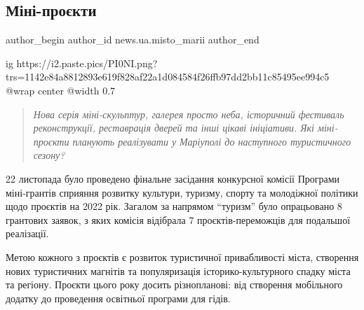  
 
 
 
 
 
\subsection{Міні-проєкти}
\label{sec:23_11_2021.stz.news.ua.misto_marii.1.mini_proekty_plany}
 
\ifcmt
 author_begin
   author_id news.ua.misto_marii
 author_end
\fi

\ifcmt
  ig https://i2.paste.pics/PI0NI.png?trs=1142e84a8812893e619f828af22a1d084584f26ffb97dd2bb11c85495ee994c5
  @wrap center
  @width 0.7
\fi

\begin{quote}
\em
Нова серія міні-скульптур, галерея просто неба, історичний фестиваль
реконструкції, реставрація дверей та інші цікаві ініціативи. Які міні-проєкти
планують реалізувати у Маріуполі до наступного туристичного сезону?	
\end{quote}

22 листопада було проведено фінальне засідання конкурсної комісії Програми
міні-грантів сприяння розвитку культури, туризму, спорту та молодіжної політики
щодо проєктів на 2022 рік. Загалом за напрямом \enquote{туризм} було опрацьовано 8
грантових заявок, з яких комісія відібрала 7 проєктів-переможців для подальшої
реалізації.

Метою кожного з проєктів є розвиток туристичної привабливості міста, створення
нових туристичних магнітів та популяризація історико-культурного спадку міста
та регіону. Проєкти цього року досить різнопланові: від створення мобільного
додатку до проведення освітньої програми для гідів.

